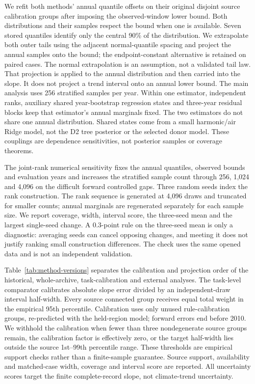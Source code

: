 We refit both methods' annual quantile offsets on their original disjoint source calibration groups after imposing the observed-window lower bound. Both distributions and their samples respect the bound when one is available. Seven stored quantiles identify only the central 90\% of the distribution. We extrapolate both outer tails using the adjacent normal-quantile spacing and project the annual samples onto the bound; the endpoint-constant alternative is retained on paired cases. The normal extrapolation is an assumption, not a validated tail law. That projection is applied to the annual distribution and then carried into the slope. It does not project a trend interval onto an annual lower bound. The main analysis uses 256 stratified samples per year. Within one estimator, independent ranks, auxiliary shared year-bootstrap regression states and three-year residual blocks keep that estimator's annual marginals fixed. The two estimators do not share one annual distribution. Shared states come from a small harmonic/air Ridge model, not the D2 tree posterior or the selected donor model. These couplings are dependence sensitivities, not posterior samples or coverage theorems.

The joint-rank numerical sensitivity fixes the annual quantiles, observed bounds and evaluation years and increases the stratified sample count through 256, 1,024 and 4,096 on the difficult forward controlled gaps. Three random seeds index the rank construction. The rank sequence is generated at 4,096 draws and truncated for smaller counts; annual marginals are regenerated separately for each sample size. We report coverage, width, interval score, the three-seed mean and the largest single-seed change. A 0.3-point rule on the three-seed mean is only a diagnostic: averaging seeds can cancel opposing changes, and meeting it does not justify ranking small construction differences. The check uses the same opened data and is not an independent validation.

Table~\ref{tab:method-versions} separates the calibration and projection order of the historical, whole-archive, task-calibration and external analyses. The task-level comparator calibrates absolute slope error divided by an independent-draw interval half-width. Every source connected group receives equal total weight in the empirical 95th percentile. Calibration uses only unused rule-calibration groups, re-predicted with the held-region model; forward errors end before 2010. We withhold the calibration when fewer than three nondegenerate source groups remain, the calibration factor is effectively zero, or the target half-width lies outside the source 1st--99th percentile range. These thresholds are empirical support checks rather than a finite-sample guarantee. Source support, availability and matched-case width, coverage and interval score are reported. All uncertainty scores target the finite complete-record slope, not climate-trend uncertainty.

